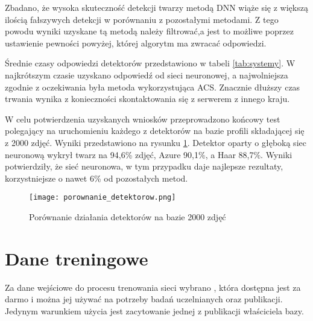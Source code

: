 Zbadano, że wysoka skuteczność detekcji twarzy metodą DNN wiąże się z większą ilością fałszywych detekcji w porównaniu z pozostałymi metodami. Z tego powodu wyniki uzyskane tą metodą należy filtrować,a jest to możliwe poprzez ustawienie pewności powyżej, której algorytm ma zwracać odpowiedzi.

Średnie czasy odpowiedzi detektorów przedstawiono w tabeli \ref{tab:systemy}. W najkrótszym czasie uzyskano odpowiedź od sieci neuronowej, a najwolniejsza zgodnie z oczekiwania była metoda wykorzystująca ACS. Znacznie dłuższy czas trwania wynika z konieczności skontaktowania się z serwerem z innego kraju.

\begin{table}[H]\label{tab:detekcja_czasy}
	\centering
	\caption{Średni czas przetwarzania zadania detekcji twarzy}
\end{table}

W celu potwierdzenia uzyskanych wniosków przeprowadzono końcowy test polegający na uruchomieniu każdego z detektorów na bazie profili składającej się z 2000 zdjęć. Wyniki przedstawiono na rysunku \ref{fig:porownanie_detektorow}. Detektor oparty o głęboką siec neuronową wykrył twarz na 94,6\% zdjęć, Azure 90,1\%, a Haar 88,7\%. Wyniki potwierdziły, że sieć neuronowa, w tym przypadku daje najlepsze rezultaty, korzystniejsze o nawet 6\% od pozostałych metod.

\begin{figure}[H]
	\centering
	\texttt{[image: porownanie\_detektorow.png]}
	\caption{Porównanie działania detektorów na bazie 2000 zdjęć}
	\label{fig:porownanie_detektorow}
\end{figure}

\section{Dane treningowe}
Za dane wejściowe do procesu trenowania sieci wybrano , która dostępna jest za darmo i można jej używać na potrzeby badań uczelnianych oraz publikacji. Jedynym warunkiem użycia jest zacytowanie jednej z publikacji właściciela bazy.

